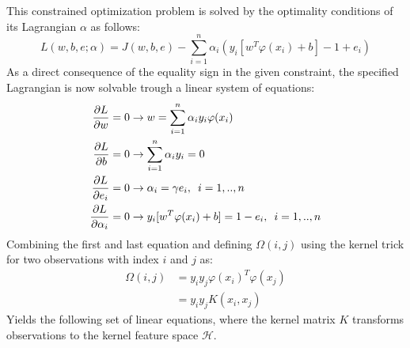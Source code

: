 \documentclass[preprint,12pt]{elsarticle}
\begin{document}
	This constrained optimization problem is solved by the optimality conditions of its Lagrangian $\alpha$ as follows:
	\begin{equation}
	L(w,b,e;\alpha) = J(w,b,e) - \sum_{i=1}^{n} \alpha_i(y_i [ w^T \varphi(x_i) + b]-1 + e_i)
	\label{eq:lagrangian}
	\end{equation}
	As a direct consequence of the equality sign in the given constraint, the specified Lagrangian is now solvable trough a linear system of equations:
	\begin{align}
	\frac{\partial L}{\partial w} &= 0 \rightarrow w = \sum_{i=1}^{n} \alpha_i y_i \varphi(x_i) \\
	\frac{\partial L}{\partial b} &= 0 \rightarrow \sum_{i=1}^n \alpha_i y_i = 0 \\
	\frac{\partial L}{\partial e_i} &= 0 \rightarrow \alpha_i = \gamma e_i,  \enskip i = 1,..,n \\
	\frac{\partial L}{\partial \alpha_i} &= 0 \rightarrow y_i [w^T \varphi(x_i) + b ] = 1 - e_i, \enskip i = 1,..,n	
	\end{align}
	Combining the first and last equation and defining $\Omega{(i,j)}$ using the kernel trick for two observations with index $i$ and $j$ as:
	\begin{align}
	\Omega{(i,j)} &= y_i y_j \varphi(x_i)^T \varphi(x_j) \\
	&= y_i y_j K(x_i, x_j)
	\end{align}
	Yields the following set of linear equations, where the kernel matrix $K$ transforms observations to the kernel feature space $\mathcal{H}$.
	
\end{document}
